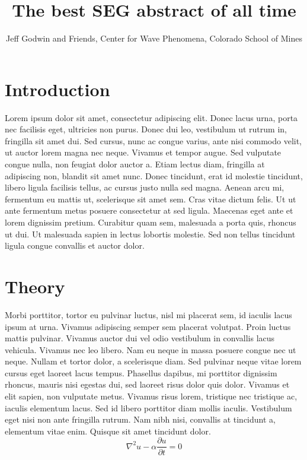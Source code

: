 
\title{The best SEG abstract of all time}
\author{Jeff Godwin and Friends, Center for Wave Phenomena, Colorado School of Mines}

\maketitle

\section{Introduction}

Lorem ipsum dolor sit amet, consectetur adipiscing elit. Donec lacus urna, porta nec facilisis eget, ultricies non purus. Donec dui leo, vestibulum ut rutrum in, fringilla sit amet dui. Sed cursus, nunc ac congue varius, ante nisi commodo velit, ut auctor lorem magna nec neque. Vivamus et tempor augue. Sed vulputate congue nulla, non feugiat dolor auctor a. Etiam lectus diam, fringilla at adipiscing non, blandit sit amet nunc. Donec tincidunt, erat id molestie tincidunt, libero ligula facilisis tellus, ac cursus justo nulla sed magna. Aenean arcu mi, fermentum eu mattis ut, scelerisque sit amet sem. Cras vitae dictum felis. Ut ut ante fermentum metus posuere consectetur at sed ligula. Maecenas eget ante et lorem dignissim pretium. Curabitur quam sem, malesuada a porta quis, rhoncus ut dui. Ut malesuada sapien in lectus lobortis molestie. Sed non tellus tincidunt ligula congue convallis et auctor dolor.

\section{Theory}
Morbi porttitor, tortor eu pulvinar luctus, nisl mi placerat sem, id iaculis lacus ipsum at urna. Vivamus adipiscing semper sem placerat volutpat. Proin luctus mattis pulvinar. Vivamus auctor dui vel odio vestibulum in convallis lacus vehicula. Vivamus nec leo libero. Nam eu neque in massa posuere congue nec ut neque. Nullam et tortor dolor, a scelerisque diam. Sed pulvinar neque vitae lorem cursus eget laoreet lacus tempus. Phasellus dapibus, mi porttitor dignissim rhoncus, mauris nisi egestas dui, sed laoreet risus dolor quis dolor. Vivamus et elit sapien, non vulputate metus. Vivamus risus lorem, tristique nec tristique ac, iaculis elementum lacus. Sed id libero porttitor diam mollis iaculis. Vestibulum eget nisi non ante fringilla rutrum. Nam nibh nisi, convallis at tincidunt a, elementum vitae enim. Quisque sit amet tincidunt dolor.
\begin{equation}
    \nabla^2 u - \alpha \frac{\partial u}{\partial t} = 0
\label{eqn:demo}
\end{equation}

